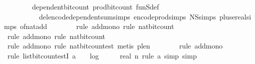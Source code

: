 \begin{isabellebody}
\ \ \ \ \ \ \ \ dependent{\isacharunderscore}{\kern0pt}bit{\isacharunderscore}{\kern0pt}count\ prod{\isacharunderscore}{\kern0pt}bit{\isacharunderscore}{\kern0pt}count\ fun\isactrlsub S{\isacharunderscore}{\kern0pt}def\isanewline
\ \ \ \ \ \ \ \ \ \ del{\isacharcolon}{\kern0pt}encode{\isacharunderscore}{\kern0pt}dependent{\isacharunderscore}{\kern0pt}sum{\isachardot}{\kern0pt}simps\ encode{\isacharunderscore}{\kern0pt}prod{\isachardot}{\kern0pt}simps\ N\isactrlsub S{\isachardot}{\kern0pt}simps\ plus{\isacharunderscore}{\kern0pt}ereal{\isachardot}{\kern0pt}simps\ of{\isacharunderscore}{\kern0pt}nat{\isacharunderscore}{\kern0pt}add{\isacharparenright}{\kern0pt}\isanewline
\ \ \ \ \ \ \isamarkupfalse%
\ {\isacharparenleft}{\kern0pt}rule\ add{\isacharunderscore}{\kern0pt}mono{\isacharcomma}{\kern0pt}\ rule\ nat{\isacharunderscore}{\kern0pt}bit{\isacharunderscore}{\kern0pt}count{\isacharparenright}{\kern0pt}\isanewline
\ \ \ \ \ \ \isamarkupfalse%
\ {\isacharparenleft}{\kern0pt}rule\ add{\isacharunderscore}{\kern0pt}mono{\isacharcomma}{\kern0pt}\ rule\ nat{\isacharunderscore}{\kern0pt}bit{\isacharunderscore}{\kern0pt}count{\isacharparenright}{\kern0pt}\isanewline
\ \ \ \ \ \ \isamarkupfalse%
\ {\isacharparenleft}{\kern0pt}rule\ add{\isacharunderscore}{\kern0pt}mono{\isacharcomma}{\kern0pt}\ rule\ nat{\isacharunderscore}{\kern0pt}bit{\isacharunderscore}{\kern0pt}count{\isacharunderscore}{\kern0pt}est{\isacharcomma}{\kern0pt}\ metis\ p{\isacharunderscore}{\kern0pt}le{\isacharunderscore}{\kern0pt}n{\isacharparenright}{\kern0pt}\isanewline
\ \ \ \ \ \ \isamarkupfalse%
\ {\isacharparenleft}{\kern0pt}rule\ add{\isacharunderscore}{\kern0pt}mono{\isacharparenright}{\kern0pt}\isanewline
\ \ \ \ \ \ \ \isamarkupfalse%
\ {\isacharparenleft}{\kern0pt}rule\ list{\isacharunderscore}{\kern0pt}bit{\isacharunderscore}{\kern0pt}count{\isacharunderscore}{\kern0pt}estI{\isacharbrackleft}{\kern0pt}\ a{\isacharequal}{\kern0pt}{\isachardoublequoteopen}{}\ {\isacharplus}{\kern0pt}\ {}\ {\isacharasterisk}{\kern0pt}\ log\ {}\ {\isacharparenleft}{\kern0pt}{}\ {\isacharplus}{\kern0pt}\ {}\ {\isacharasterisk}{\kern0pt}\ real\ n{\isacharparenright}{\kern0pt}{\isachardoublequoteclose}{\isacharbrackright}{\kern0pt}{\isacharcomma}{\kern0pt}\ rule\ a{\isacharunderscore}{\kern0pt}{}{\isacharcomma}{\kern0pt}\ simp{\isacharcomma}{\kern0pt}\ simp{\isacharparenright}{\kern0pt}\isanewline
\ \ \ \ \ \ \isamarkupfalse%

\end{isabellebody}

